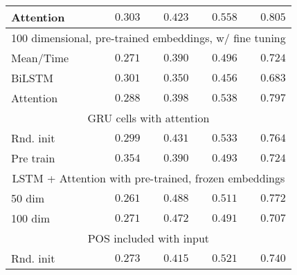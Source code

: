 \begin{table}
\begin{tabular}{lrrrr}
    Attention &         $0.303$  &         $0.423$  &         $0.558$  & $\mathbf{0.805}$ \\
    \midrule
              \multicolumn{5}{c}{100 dimensional, pre-trained embeddings, w/ fine tuning} \\
    \midrule
    Mean/Time &         $0.271$  &         $0.390$  &         $0.496$  &         $0.724$  \\
    BiLSTM    &         $0.301$  &         $0.350$  &         $0.456$  &         $0.683$  \\
    Attention &         $0.288$  &         $0.398$  &         $0.538$  &         $0.797$  \\
    \midrule
              \multicolumn{5}{c}{GRU cells with attention} \\
    \midrule
    Rnd. init &         $0.299$  &         $0.431$  &         $0.533$  &         $0.764$  \\
    Pre train & $\mathbf{0.354}$ &         $0.390$  &         $0.493$  &         $0.724$  \\
    \midrule
              \multicolumn{5}{c}{LSTM + Attention with pre-trained, frozen embeddings} \\
    \midrule
    50 dim    &         $0.261$  & $\mathbf{0.488}$ &         $0.511$  &         $0.772$  \\
    100 dim   &         $0.271$  &         $0.472$  &         $0.491$  &         $0.707$  \\
    \midrule
              \multicolumn{5}{c}{POS included with input} \\
    \midrule
    Rnd. init &         $0.273$  &         $0.415$  &         $0.521$  &         $0.740$  \\

\end{tabular}
\end{table}
